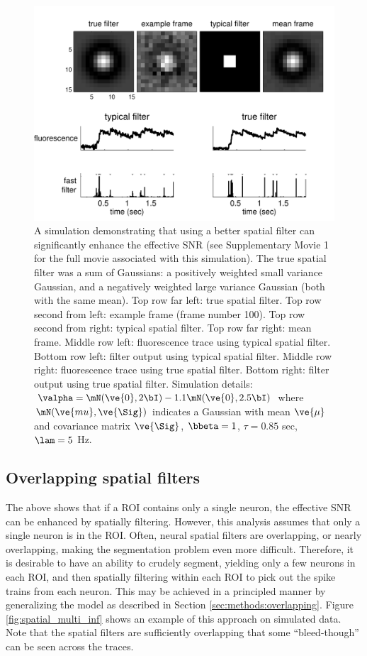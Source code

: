 \begin{figure}[h!]
\centering \includegraphics[width=.9\linewidth]{../figs/spatial2}
\caption{A simulation demonstrating that using a better spatial filter can significantly enhance the effective SNR (see Supplementary Movie 1 for the full movie associated with this simulation). The true spatial filter was a sum of Gaussians: a positively weighted small variance Gaussian, and a negatively weighted large variance Gaussian (both with the same mean).  Top row far left: true spatial filter.  Top row second from left: example frame (frame number 100). Top row second from right: typical spatial filter.   Top row far right: mean frame.  Middle row left: fluorescence trace using typical spatial filter. Bottom row left: \foopsi filter output using typical spatial filter.  Middle row right: fluorescence trace using true spatial filter.  Bottom right: \foopsi filter output using true spatial filter. Simulation details: $\valpha=\mN(\ve{0},2 \bI)-1.1 \mN(\ve{0},2.5 \bI)$ where $\mN(\ve{mu},\ve{\Sig})$ indicates a Gaussian with mean $\ve{\mu}$ and covariance matrix $\ve{\Sig}$, $\bbeta=1$, $\tau=0.85$ sec, $\lam=5$ Hz.} \label{fig:spatial} 
\end{figure}



\subsection{Overlapping spatial filters}


The above shows that if a ROI contains only a single neuron, the effective SNR can be enhanced by spatially filtering.  However, this analysis assumes that only a single neuron is in the ROI.  Often, neural spatial filters are overlapping, or nearly overlapping, making the segmentation problem even more difficult.  Therefore, it is desirable to have an ability to crudely segment, yielding only a few neurons in each ROI, and then spatially filtering within each ROI to pick out the spike trains from each neuron.  This may be achieved in a principled manner by generalizing the model as described in Section \ref{sec:methods:overlapping}.  Figure \ref{fig:spatial_multi_inf} shows an example of this approach on simulated data. Note that the spatial filters are sufficiently overlapping that some ``bleed-though'' can be seen across the traces.  


